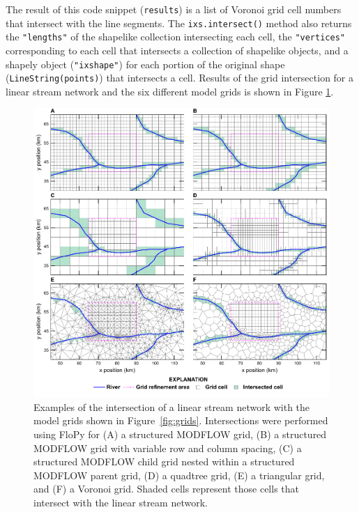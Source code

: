 \documentclass[12pt, oneside]{article}  	%
\begin{document}
\noindent The result of this code snippet (\texttt{results}) is a list of Voronoi grid cell numbers that intersect with the line segments. The \texttt{ixs.intersect()} method also returns the \texttt{"lengths"} of the shapelike collection intersecting each cell, the \texttt{"vertices"} corresponding to each cell that intersects a collection of shapelike objects, and a shapely object (\texttt{"ixshape"}) for each portion of the original shape (\texttt{LineString(points)}) that intersects a cell. Results of the grid intersection for a linear stream network and the six different model grids is shown in Figure \ref{fig:intersections}.

\begin{figure}[ht!]
	\begin{center}
		\includegraphics{figures/grids_intersection.pdf}
	\end{center}
	\caption{Examples of the intersection of a linear stream network with the model grids shown in Figure~\ref{fig:grids}. Intersections were performed using FloPy for (A) a structured MODFLOW grid, (B) a structured MODFLOW grid with variable row and column spacing, (C) a structured MODFLOW child grid nested within a structured MODFLOW parent grid, (D) a quadtree grid, (E) a triangular grid, and (F) a Voronoi grid. Shaded cells represent those cells that intersect with the linear stream network.}
	\label{fig:intersections}
\end{figure}
\end{document}
